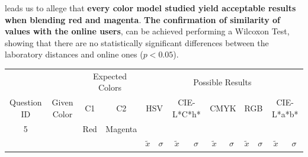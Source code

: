 leads us to allege that \textbf{every color model studied yield acceptable results when blending red and magenta}. \textbf{The confirmation of similarity of values with the online users},
can be achieved performing a Wilcoxon Test, showing that there are no statistically significant differences between the laboratory distances and online ones ($p < 0.05$).
%
\begin{table}[H]
  \resizebox{\textwidth}{!} {
  \begin{tabular}{lccccccccccccc}
    \hline
    \multicolumn{1}{c}{}                              &                                      & \multicolumn{2}{c}{Expected Colors}                   & \multicolumn{10}{c}{Possible Results}                                                                                                                                                                                                                                                                                        \\ \cline{3-14}
    \multicolumn{1}{c}{\multirow{-2}{*}{Question ID}} & \multirow{-2}{*}{Given Color}        & C1                       & C2                         & \multicolumn{2}{c}{HSV}                                        & \multicolumn{2}{c}{CIE-L*C*h*}                                 & \multicolumn{2}{c}{CMYK}                                       & \multicolumn{2}{c}{RGB}                                        & \multicolumn{2}{c}{CIE-L*a*b*}                                 \\ \hline
    \multicolumn{1}{c}{5}                             & \cellcolor[HTML]{FF0080}{\color[HTML]{FFFFFF}(45, 23, 22)} & \multicolumn{1}{c|}{Red} & \multicolumn{1}{c|}{Magenta}  & \multicolumn{2}{c|}{\cellcolor[HTML]{FF0080}{\color[HTML]{FFFFFF}(45, 23, 22)}}      & \multicolumn{2}{c|}{\cellcolor[HTML]{FF0080}{\color[HTML]{FFFFFF}(45, 23, 22)}}       & \multicolumn{2}{c|}{\cellcolor[HTML]{FF0080}{\color[HTML]{FFFFFF}(45, 23, 22)}}       & \multicolumn{2}{c|}{\cellcolor[HTML]{FF0080}{\color[HTML]{FFFFFF}(45, 23, 22)}}       & \multicolumn{2}{c|}{\cellcolor[HTML]{FF0087}{\color[HTML]{FFFFFF}(45, 23, 25)}}       \\ \hline
                                                      & \multicolumn{1}{l}{}                 & \multicolumn{1}{l}{}     & \multicolumn{1}{l}{}       & \multicolumn{1}{c}{$\tilde{x}$} & \multicolumn{1}{c}{$\sigma$} & \multicolumn{1}{c}{$\tilde{x}$} & \multicolumn{1}{c}{$\sigma$} & \multicolumn{1}{c}{$\tilde{x}$} & \multicolumn{1}{c}{$\sigma$} & \multicolumn{1}{c}{$\tilde{x}$} & \multicolumn{1}{c}{$\sigma$} & \multicolumn{1}{c}{$\tilde{x}$} & \multicolumn{1}{c}{$\sigma$} \\ \hline

\end{tabular}}
\end{table}
